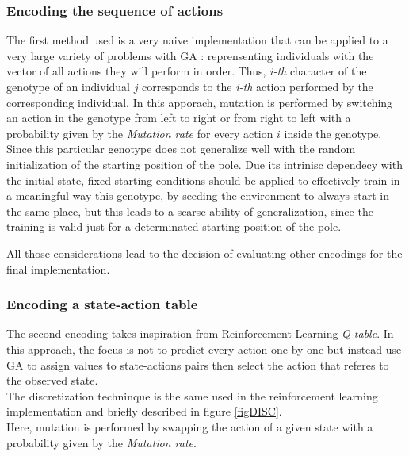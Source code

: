 \subsubsection{Encoding the sequence of actions}
The first method used is a very naive implementation that can be applied to a very large variety of problems with GA : reprensenting individuals with the vector of all actions they will perform in order.
Thus, \textit{i-th} character of the genotype of an individual $j$ corresponds to the \textit{i-th} action performed by the corresponding individual.
In this apporach, mutation is performed by switching an action in the genotype from left to right or from right to left with a probability given by the \textit{Mutation rate} for every action $i$ inside the genotype.
\\
Since this particular genotype does not generalize well with the random initialization of the starting position of the pole. Due its intrinisc dependecy with the initial state, fixed starting conditions should be applied to effectively train in a meaningful way this genotype, by seeding the environment to always start in the same place, but this leads to a scarse ability of generalization, since the training is valid just for a determinated starting position of the pole.

All those considerations lead to the decision of evaluating other encodings for the final implementation.\\
\subsubsection{Encoding a state-action table}
The second encoding takes inspiration from Reinforcement Learning \textit{Q-table}.
In this approach, the focus is not to predict every action one by one  but instead use GA to assign values to state-actions pairs then select the action that referes to the observed state.\\
The discretization techninque is the same used in the reinforcement learning implementation and briefly described in figure \ref{figDISC}.\\
Here, mutation is performed by swapping the action of a given state with a probability given by the \textit{Mutation rate}.
\\

